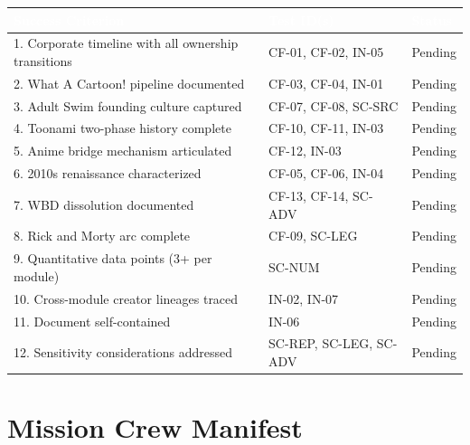 \documentclass[11pt,letterpaper]{article}
\newcommand{\tableheader}[1]{\textbf{\sffamily\textcolor{white}{#1}}}
\begin{document}
\begin{center}
\begin{tabularx}{\textwidth}{XL{4cm}C{2cm}}
\toprule
{}
\tableheader{Success Criterion} & \tableheader{Test ID(s)} & \tableheader{Status} \\
. Corporate timeline with all ownership transitions & CF-01, CF-02, IN-05 & Pending \\
2. What A Cartoon! pipeline documented & CF-03, CF-04, IN-01 & Pending \\
3. Adult Swim founding culture captured & CF-07, CF-08, SC-SRC & Pending \\
4. Toonami two-phase history complete & CF-10, CF-11, IN-03 & Pending \\
5. Anime bridge mechanism articulated & CF-12, IN-03 & Pending \\
6. 2010s renaissance characterized & CF-05, CF-06, IN-04 & Pending \\
7. WBD dissolution documented & CF-13, CF-14, SC-ADV & Pending \\
8. Rick and Morty arc complete & CF-09, SC-LEG & Pending \\
9. Quantitative data points (3+ per module) & SC-NUM & Pending \\
10. Cross-module creator lineages traced & IN-02, IN-07 & Pending \\
11. Document self-contained & IN-06 & Pending \\
12. Sensitivity considerations addressed & SC-REP, SC-LEG, SC-ADV & Pending \\
\bottomrule
\end{tabularx}
\end{center}

\section{Mission Crew Manifest}
\end{document}
